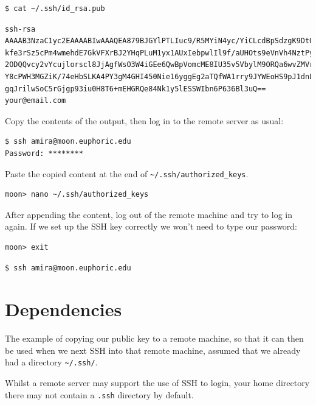 \documentclass[
]{krantz}
\begin{document}
\begin{verbatim}
$ cat ~/.ssh/id_rsa.pub
\end{verbatim}

\begin{verbatim}
ssh-rsa AAAAB3NzaC1yc2EAAAABIwAAAQEA879BJGYlPTLIuc9/R5MYiN4yc/YiCLcdBpSdzgK9Dt0B
kfe3rSz5cPm4wmehdE7GkVFXrBJ2YHqPLuM1yx1AUxIebpwlIl9f/aUHOts9eVnVh4NztPy0iSU/Sv0b
2ODQQvcy2vYcujlorscl8JjAgfWsO3W4iGEe6QwBpVomcME8IU35v5VbylM9ORQa6wvZMVrPECBvwItT
Y8cPWH3MGZiK/74eHbSLKA4PY3gM4GHI450Nie16yggEg2aTQfWA1rry9JYWEoHS9pJ1dnLqZU3k/8OW
gqJrilwSoC5rGjgp93iu0H8T6+mEHGRQe84Nk1y5lESSWIbn6P636Bl3uQ== your@email.com
\end{verbatim}

Copy the contents of the output,
then log in to the remote server as usual:

\begin{verbatim}
$ ssh amira@moon.euphoric.edu
Password: ********
\end{verbatim}

Paste the copied content at the end of \texttt{\textasciitilde{}/.ssh/authorized\_keys}.

\begin{verbatim}
moon> nano ~/.ssh/authorized_keys
\end{verbatim}

After appending the content,
log out of the remote machine and try to log in again.
If we set up the SSH key correctly we won't need to type our password:

\begin{verbatim}
moon> exit
\end{verbatim}

\begin{verbatim}
$ ssh amira@moon.euphoric.edu
\end{verbatim}

\hypertarget{ssh-filedir}{%
\section{Dependencies}\label{ssh-filedir}}

The example of copying our public key to a remote machine, so that it
can then be used when we next SSH into that remote machine, assumed
that we already had a directory \texttt{\textasciitilde{}/.ssh/}.

Whilst a remote server may support the use of SSH to login, your home
directory there may not contain a \texttt{.ssh} directory by default.
\end{document}
